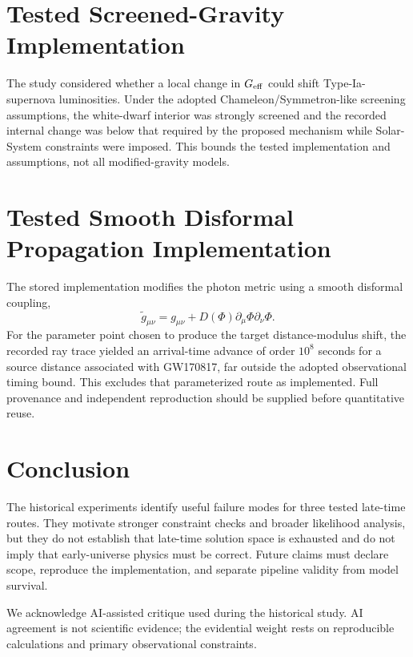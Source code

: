 \documentclass[reprint,amsmath,amssymb,aps,prd,floatfix]{revtex4-2}
\begin{document}
\section{Tested Screened-Gravity Implementation}
The study considered whether a local change in $G_{\rm eff}$ could shift Type-Ia-supernova luminosities. Under the adopted Chameleon/Symmetron-like screening assumptions, the white-dwarf interior was strongly screened and the recorded internal change was below that required by the proposed mechanism while Solar-System constraints were imposed. This bounds the tested implementation and assumptions, not all modified-gravity models.

\section{Tested Smooth Disformal Propagation Implementation}
The stored implementation modifies the photon metric using a smooth disformal coupling,
\begin{equation}
\tilde{g}_{\mu\nu}=g_{\mu\nu}+D(\Phi)\partial_\mu\Phi\partial_\nu\Phi.
\end{equation}
For the parameter point chosen to produce the target distance-modulus shift, the recorded ray trace yielded an arrival-time advance of order $10^8$ seconds for a source distance associated with GW170817, far outside the adopted observational timing bound. This excludes that parameterized route as implemented. Full provenance and independent reproduction should be supplied before quantitative reuse.

\section{Conclusion}
The historical experiments identify useful failure modes for three tested late-time routes. They motivate stronger constraint checks and broader likelihood analysis, but they do not establish that late-time solution space is exhausted and do not imply that early-universe physics must be correct. Future claims must declare scope, reproduce the implementation, and separate pipeline validity from model survival.

\begin{acknowledgments}
We acknowledge AI-assisted critique used during the historical study. AI agreement is not scientific evidence; the evidential weight rests on reproducible calculations and primary observational constraints.
\end{acknowledgments}
\end{document}

